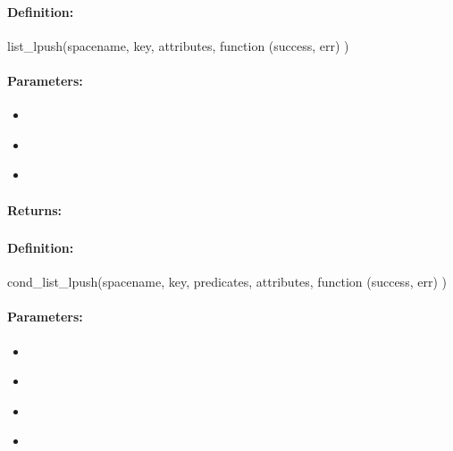 \paragraph{Definition:}
\begin{javascriptcode}
list_lpush(spacename, key, attributes, function (success, err) {})
\end{javascriptcode}
\paragraph{Parameters:}
\begin{itemize}[noitemsep]
\item {}\\

\item {}\\

\item {}\\

\end{itemize}

\paragraph{Returns:}


\pagebreak
\subsubsection{}
\label{api:nodejs:cond_list_lpush}


\paragraph{Definition:}
\begin{javascriptcode}
cond_list_lpush(spacename, key, predicates, attributes, function (success, err) {})
\end{javascriptcode}
\paragraph{Parameters:}
\begin{itemize}[noitemsep]
\item {}\\

\item {}\\

\item {}\\

\item {}\\

\end{itemize}

